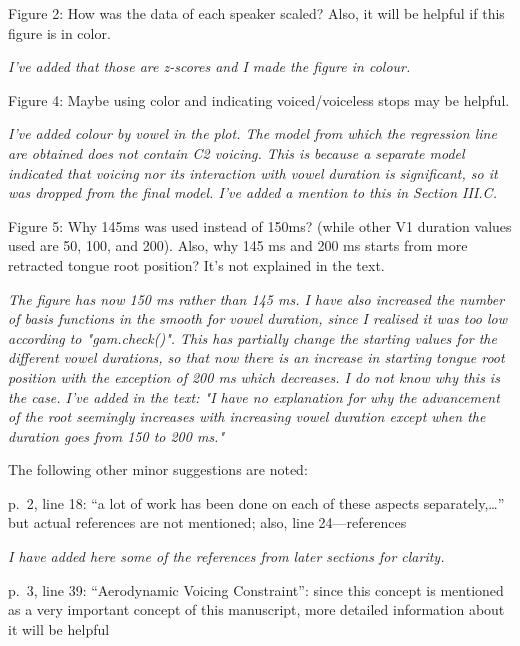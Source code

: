 \documentclass[]{article}
\begin{document}
Figure 2: How was the data of each speaker scaled? Also, it will be
helpful if this figure is in color.

\begin{adjustwidth}{1cm}{} \textit{
I've added that those are z-scores and I made the figure in colour.
} \end{adjustwidth}

Figure 4: Maybe using color and indicating voiced/voiceless stops may be
helpful.

\begin{adjustwidth}{1cm}{} \textit{
I've added colour by vowel in the plot. The model from which the regression line are obtained does not contain C2 voicing. This is because a separate model indicated that voicing nor its interaction with vowel duration is significant, so it was dropped from the final model. I've added a mention to this in Section III.C.
} \end{adjustwidth}

Figure 5: Why 145ms was used instead of 150ms? (while other V1 duration
values used are 50, 100, and 200). Also, why 145 ms and 200 ms starts
from more retracted tongue root position? It's not explained in the
text.

\begin{adjustwidth}{1cm}{} \textit{
The figure has now 150 ms rather than 145 ms. I have also increased the number of basis functions in the smooth for vowel duration, since I realised it was too low according to "gam.check()". This has partially change the starting values for the different vowel durations, so that now there is an increase in starting tongue root position with the exception of 200 ms which decreases. I do not know why this is the case. I've added in the text: "I have no explanation for why the advancement of the root seemingly increases with increasing vowel duration except when the duration goes from 150 to 200 ms."
} \end{adjustwidth}

The following other minor suggestions are noted:

p.~2, line 18: ``a lot of work has been done on each of these aspects
separately,\ldots{}'' but actual references are not mentioned; also,
line 24---references

\begin{adjustwidth}{1cm}{} \textit{
I have added here some of the references from later sections for clarity.
} \end{adjustwidth}

p.~3, line 39: ``Aerodynamic Voicing Constraint'': since this concept is
mentioned as a very important concept of this manuscript, more detailed
information about it will be helpful
\end{document}
